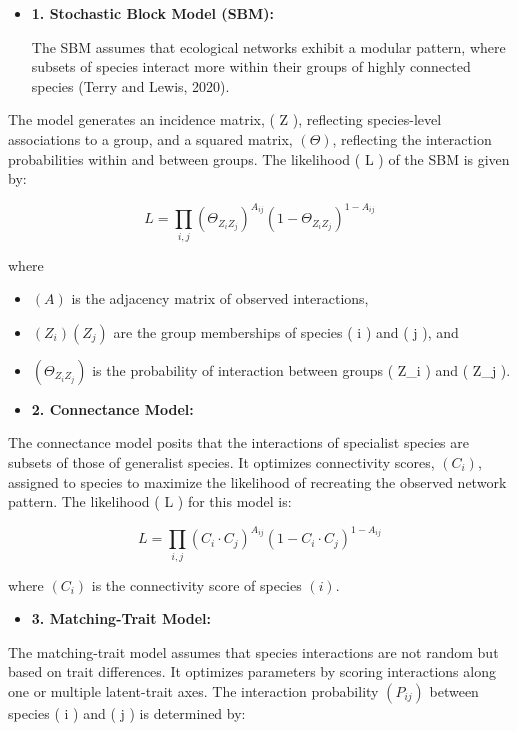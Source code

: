 \documentclass[
]{agujournal2019}
\providecommand{\tightlist}{%
  \setlength{\itemsep}{0pt}\setlength{\parskip}{0pt}}\usepackage{longtable,booktabs,array}
\begin{document}
\begin{itemize}
\item
  \textbf{1. Stochastic Block Model (SBM):}

  The SBM assumes that ecological networks exhibit a modular pattern,
  where subsets of species interact more within their groups of highly
  connected species (Terry and Lewis, 2020).
\end{itemize}

The model generates an incidence matrix, ( Z ), reflecting species-level
associations to a group, and a squared matrix, \(( \Theta )\),
reflecting the interaction probabilities within and between groups. The
likelihood ( L ) of the SBM is given by:

\[
L = \prod_{i,j} \left( \Theta_{Z_i Z_j} \right)^{A_{ij}} \left( 1 - \Theta_{Z_i Z_j} \right)^{1 - A_{ij}}
\]

where

\begin{itemize}
\item
  \(( A )\) is the adjacency matrix of observed interactions,
\item
  \(( Z_i) (Z_j)\) are the group memberships of species ( i ) and ( j ),
  and
\item
  \(( \Theta_{Z_i Z_j} )\) is the probability of interaction between
  groups ( Z\_i ) and ( Z\_j ).
\item
  \textbf{2. Connectance Model:}
\end{itemize}

The connectance model posits that the interactions of specialist species
are subsets of those of generalist species. It optimizes connectivity
scores, \(( C_i)\), assigned to species to maximize the likelihood of
recreating the observed network pattern. The likelihood ( L ) for this
model is:

\[
L = \prod_{i,j} \left( C_i \cdot C_j \right)^{A_{ij}} \left( 1 - C_i \cdot C_j \right)^{1 - A_{ij}}
\]

where \(( C_i)\) is the connectivity score of species \((i)\).

\begin{itemize}
\tightlist
\item
  \textbf{3. Matching-Trait Model:}
\end{itemize}

The matching-trait model assumes that species interactions are not
random but based on trait differences. It optimizes parameters by
scoring interactions along one or multiple latent-trait axes. The
interaction probability \(( P_{ij})\) between species ( i ) and ( j ) is
determined by:
\end{document}
